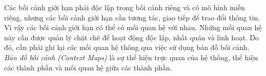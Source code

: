 Các bối cảnh giới hạn phải độc lập trong bối cảnh riêng và có mô hình miền riêng, nhưng các bối cảnh giới hạn   cần tương tác, giao tiếp   để trao đổi thông tin.   Vì vậy các bối cảnh giới hạn có thể có mối quan hệ với nhau.    Những mối quan hệ này cần được quản lý chặt chẽ để hoạt động độc lập, nhất quán và linh hoạt. Do đó, cần phải ghi lại các mối quan hệ thông qua việc sử dụng bản đồ bối cảnh. \emph{Bản đồ bối cảnh (Context Maps)} là sự thể hiện trực quan của hệ thống, thể hiện các thành phần và mối quan hệ giữa các thành phần.
 